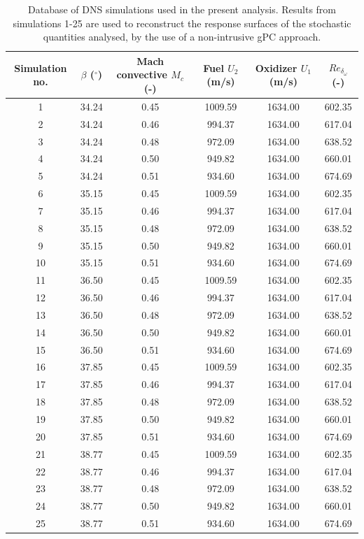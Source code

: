 \documentclass[conf]{new-aiaa}
\begin{document}
\begin{table}[!ht]
\centering \footnotesize
\begin{tabular}{| c | c | c | c | c | c |}
\hline\hline
Simulation no. & $\beta$ ($^\circ$) & 	Mach convective $M_c$ (-) & Fuel $U_2$ (m/s) & Oxidizer $U_1$ (m/s) & ${Re_{\delta_{\omega}}}$ (-)\\ \hline\hline
1&34.24&0.45&1009.59&1634.00&602.35\\
2&34.24&0.46&994.37&1634.00&617.04\\
3&34.24&0.48&972.09&1634.00&638.52\\
4&34.24&0.50&949.82&1634.00&660.01\\
5&34.24&0.51&934.60&1634.00&674.69\\
6&35.15&0.45&1009.59&1634.00&602.35\\
7&35.15&0.46&994.37&1634.00&617.04\\
8&35.15&0.48&972.09&1634.00&638.52\\
9&35.15&0.50&949.82&1634.00&660.01\\
10&35.15&0.51&934.60&1634.00&674.69\\
11&36.50&0.45&1009.59&1634.00&602.35\\
12&36.50&0.46&994.37&1634.00&617.04\\
13&36.50&0.48&972.09&1634.00&638.52\\
14&36.50&0.50&949.82&1634.00&660.01\\
15&36.50&0.51&934.60&1634.00&674.69\\
16&37.85&0.45&1009.59&1634.00&602.35\\
17&37.85&0.46&994.37&1634.00&617.04\\
18&37.85&0.48&972.09&1634.00&638.52\\
19&37.85&0.50&949.82&1634.00&660.01\\
20&37.85&0.51&934.60&1634.00&674.69\\
21&38.77&0.45&1009.59&1634.00&602.35\\
22&38.77&0.46&994.37&1634.00&617.04\\
23&38.77&0.48&972.09&1634.00&638.52\\
24&38.77&0.50&949.82&1634.00&660.01\\
25&38.77&0.51&934.60&1634.00&674.69\\
\hline \hline
\end{tabular}
\caption{Database of DNS simulations used in the present analysis. Results from
simulations 1-25 are used to reconstruct the response surfaces of the stochastic quantities
analysed, by the use of a non-intrusive gPC approach.}
\label{tab:config-mel-couche-cis-1}
\end{table}
\end{document}
